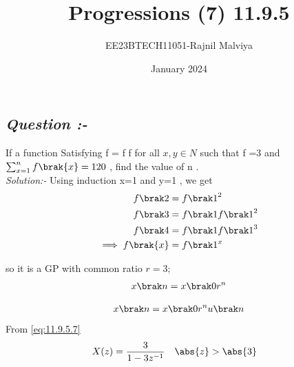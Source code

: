 \documentclass[journal,12pt,twocolumn]{IEEEtran}
\theoremstyle{remark}
\begin{document}
\title{Progressions (7) 11.9.5}
\author{EE23BTECH11051-Rajnil Malviya}
\date{January 2024}
\maketitle
\subsection*{\textit{Question :-}}
If a function Satisfying f = f f for all $x,y \in {N}$ such that f =3 and $\sum_{x=1}^{n} f\brak{x} = 120$ , find the value of n .\\
\textit{Solution:- }
Using induction  x=1 and y=1 , we get
\begin{align}
    f\brak2&={f\brak1}^2\\
      f\brak3&=f\brak1{f\brak1}^2\\
        f\brak4&=f\brak1{f\brak1}^3\\
        \implies   f\brak{x}&= f\brak1^x
\end{align}

so it is a GP with common ratio $r=3 ;$
\begin{align}
    x \brak n = x \brak 0r^{n}
\end{align}

\begin{table}[h!]
            
    \end{table}
\begin{align}
x \brak n = x \brak 0r^{n}u\brak n
\label{eq:11.9.5.7}
\end{align}
From \eqref{eq:11.9.5.7}
\begin{align}
X(z) &=\frac{3}{1-3z^{-1}} \quad \abs{z} > \abs{3}
\end{align}
\end{document}
